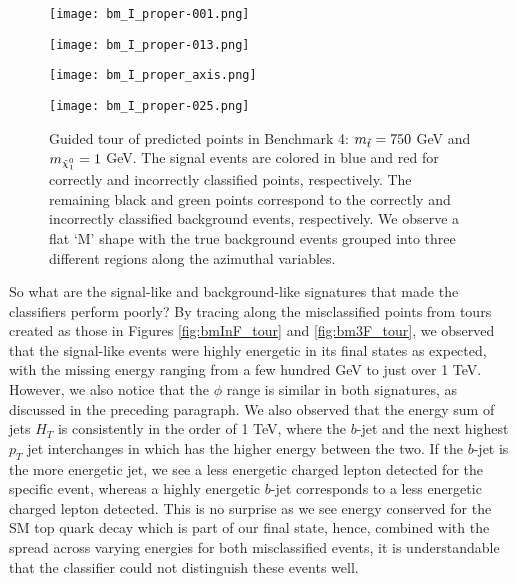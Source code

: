 \begin{figure}[htbp]
\centering
  \begin{minipage}[htbp]{0.4\textwidth}
    \centering
    \texttt{[image: bm\_I\_proper-001.png]}
  \end{minipage}
  \begin{minipage}[htbp]{0.4\textwidth}
    \centering
    \texttt{[image: bm\_I\_proper-013.png]}
  \end{minipage}
  \begin{minipage}[htbp]{0.4\textwidth}
    \centering
    \texttt{[image: bm\_I\_proper\_axis.png]}
  \end{minipage}
  \begin{minipage}[htbp]{0.4\textwidth}
    \centering
    \texttt{[image: bm\_I\_proper-025.png]}
  \end{minipage}
  \caption{Guided tour of predicted points in  Benchmark 4: $m_{\Tilde{t}} = 750$ GeV and $m_{\Tilde{\chi}_1^0} = 1$ GeV. The signal events are colored in blue and red for correctly and incorrectly classified points, respectively. The remaining black and green points correspond to the correctly and incorrectly classified background events, respectively. We observe a flat `M' shape with the true background events grouped into three different regions along the azimuthal variables.}
  \label{fig:bmIn_tour}
\end{figure}

So what are the signal-like and background-like signatures that made the classifiers perform poorly? By tracing along the misclassified points from tours created as those in Figures \ref{fig:bmInF_tour} and \ref{fig:bm3F_tour}, we observed that the signal-like events were highly energetic in its final states as expected, with the missing energy ranging from a few hundred GeV to just over 1 TeV. However, we also notice that the $\phi$ range is similar in both signatures, as discussed in the preceding paragraph. We also observed that the energy sum of jets $H_T$ is consistently in the order of 1 TeV, where the $b$-jet and the next highest $p_T$ jet interchanges in which has the higher energy between the two. If the $b$-jet is the more energetic jet, we see a less energetic charged lepton detected for the specific event, whereas a highly energetic $b$-jet corresponds to a less energetic charged lepton detected. This is no surprise as we see energy conserved for the SM top quark decay which is part of our final state, hence, combined with the spread across varying energies for both misclassified events, it is understandable that the classifier could not distinguish these events well. 

